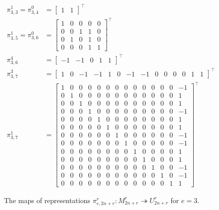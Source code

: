\documentclass{amsart}
\begin{document}
\begin{figure}
\begin{align*} 
  \pi_{3,3}^1 = \pi_{3,4}^0 &=  
\begin{bmatrix}
  1 & 1
\end{bmatrix}^\intercal\\
\pi_{3,5}^1 = \pi_{3,6}^0&=  
\begin{bmatrix}
  1 & 0 & 0 & 0 & 0\\
  0 & 0 & 1 & 1 & 0\\
  0 & 1 & 0 & 1 & 0\\
  0 & 0 & 0 & 1 & 1
\end{bmatrix}^\intercal\\
\pi_{3,6}^4&=  
\begin{bmatrix}
  -1 & -1 & 0 & 1 & 1
\end{bmatrix}^\intercal\\
\pi_{3,7}^3&=  
\begin{bmatrix}
 1 & 0 &-1 &-1 & 1 & 0 & -1 & -1 & 0 & 0 & 0 & 0 & 1 & 1
\end{bmatrix}^\intercal\\
\pi_{3,7}^1&=  
\begin{bmatrix}
 1 & 0 & 0 & 0 & 0 & 0 & 0 & 0 & 0 & 0 & 0 & 0 & 0 &-1\\
 0 & 1 & 0 & 0 & 0 & 0 & 0 & 0 & 0 & 0 & 0 & 0 & 0 & 1\\
 0 & 0 & 1 & 0 & 0 & 0 & 0 & 0 & 0 & 0 & 0 & 0 & 0 & 1\\
 0 & 0 & 0 & 1 & 0 & 0 & 0 & 0 & 0 & 0 & 0 & 0 & 0 &-1\\
 0 & 0 & 0 & 0 & 1 & 0 & 0 & 0 & 0 & 0 & 0 & 0 & 0 & 1\\
 0 & 0 & 0 & 0 & 0 & 1 & 0 & 0 & 0 & 0 & 0 & 0 & 0 & 1\\
 0 & 0 & 0 & 0 & 0 & 0 & 1 & 0 & 0 & 0 & 0 & 0 & 0 &-1\\
 0 & 0 & 0 & 0 & 0 & 0 & 0 & 1 & 0 & 0 & 0 & 0 & 0 &-1\\
 0 & 0 & 0 & 0 & 0 & 0 & 0 & 0 & 1 & 0 & 0 & 0 & 0 & 1\\
 0 & 0 & 0 & 0 & 0 & 0 & 0 & 0 & 0 & 1 & 0 & 0 & 0 & 1\\
 0 & 0 & 0 & 0 & 0 & 0 & 0 & 0 & 0 & 0 & 1 & 0 & 0 &-1\\
 0 & 0 & 0 & 0 & 0 & 0 & 0 & 0 & 0 & 0 & 0 & 1 & 0 &-1\\
 0 & 0 & 0 & 0 & 0 & 0 & 0 & 0 & 0 & 0 & 0 & 0 & 1 & 1
\end{bmatrix}^\intercal
\end{align*}
\caption{The maps of representations $\pi_{e,2n+r}^r:M_{2n + r}^r \twoheadrightarrow U_{2n+r}^r$ for $e = 3$.}
\label{Composition series e=3}
\end{figure}
  
\end{document}
